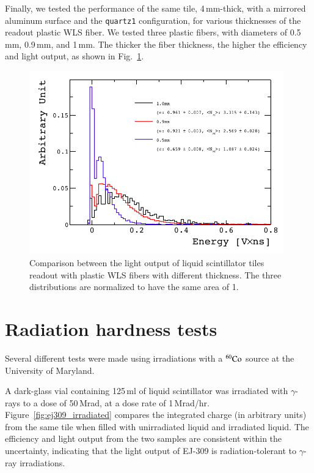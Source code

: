 \documentclass[review]{elsarticle}
\begin{document}
Finally, we tested the performance of the same tile, 4\,mm-thick, with a
mirrored aluminum surface and the \verb+quartz1+ configuration,
for various thicknesses of the
readout plastic WLS fiber. We tested three plastic fibers, with 
diameters of 0.5\,mm, 0.9\,mm, and 1\,mm. The thicker the
fiber thickness, the higher the efficiency and light output, as shown
in Fig.~\ref{fig:fiber_thickness_comp}.

\begin{figure}[!ht]
\begin{center}
\includegraphics[width=0.98\textwidth]{./figures/list_Fiber_Thickness_all_1.png}
\caption{Comparison between the light output of liquid scintillator
  tiles readout with plastic WLS fibers with different thickness. The
  three distributions are normalized to have the same area of 1.}
\label{fig:fiber_thickness_comp}
\end{center}
\end{figure}

\section{Radiation hardness tests}

Several different tests were made using irradiations with a
$\rm{^{60}Co}$ source at the University of Maryland.

A dark-glass vial containing 125\,ml
of liquid scintillator was irradiated with $\gamma$-rays to a
dose of 50\,Mrad, at a dose rate of 1\,Mrad/hr.
Figure~\ref{fig:ej309_irradiated} compares the integrated charge (in arbitrary units)
from the same tile when filled with unirradiated liquid and irradiated liquid.
The efficiency and light output from the two samples are
consistent within the uncertainty, indicating that the light output of EJ-309 is
radiation-tolerant to $\gamma$-ray irradiations.
\end{document}
